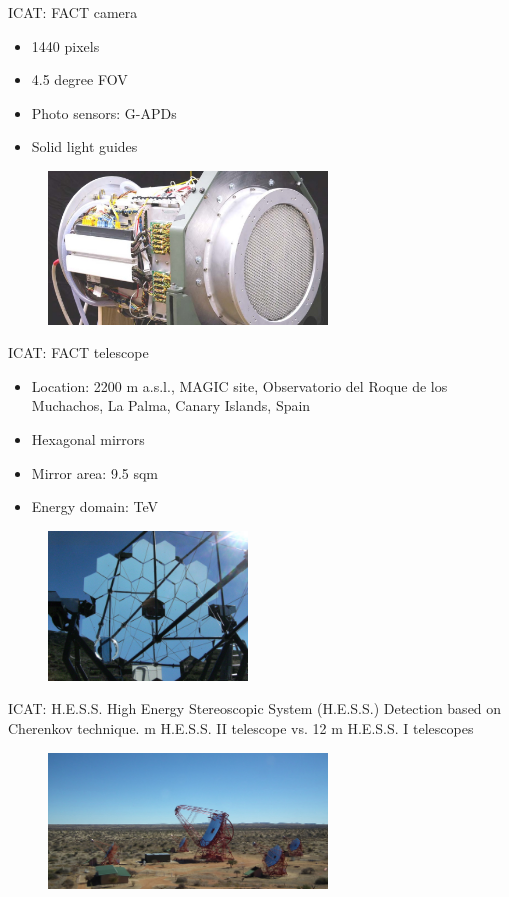 \documentclass{beamer}
\begin{document}
\begin{frame}{ICAT: FACT camera}
	\begin{itemize}
		\item 1440 pixels
		\item 4.5 degree FOV
		\item Photo sensors: G-APDs
		\item Solid light guides
	\end{itemize}
	\begin{figure}[h]
		\includegraphics[width=280px]{ICATcamera.jpg}
	\end{figure}
\end{frame}



\begin{frame}{ICAT: FACT telescope}
	\begin{itemize}
		\item Location: 2200 m a.s.l., MAGIC site, Observatorio del Roque de los Muchachos, La Palma, Canary Islands, Spain
		\item Hexagonal mirrors
		\item Mirror area: 9.5 sqm
		\item Energy domain: TeV
	\end{itemize}
	\begin{figure}[h]
		\includegraphics[width=200px]{FACTtelescope.jpg}
	\end{figure}
\end{frame}




\begin{frame}{ICAT: H.E.S.S.}
	High Energy Stereoscopic System (H.E.S.S.)
	Detection based on Cherenkov technique.
	 m H.E.S.S. II telescope vs. 12 m H.E.S.S. I telescopes
	\begin{figure}[h]
		\includegraphics[width=280px]{Array_overviewS.jpg}
	\end{figure}
\end{frame}
\end{document}
